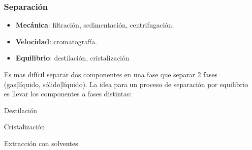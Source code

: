             
            \begin{quote}
                \textit{}
            \end{quote}
            
            
            \begin{quote}
                \textit{}
            \end{quote}
            
            
            \begin{quote}
                \textit{}
            \end{quote}
        
        \subsubsection{Separación}
        
            
            \begin{itemize}
                \item \textbf{Mecánica}: filtración, sedimentación, centrifugación.
                \item \textbf{Velocidad}: cromatografía.
                \item \textbf{Equilibrio}: destilación, cristalización
            \end{itemize}
            
            
            Es mas difícil separar dos componentes en una fase que separar 2 fases (gas|líquido, sólido|líquido). La idea para un proceso de separación por equilibrio es llevar los componentes a fases distintas:
            
            \begin{itemize}
                \begin{minipage}{0.3\linewidth}
                    \item Destilación
                \end{minipage}
                \begin{minipage}{0.3\linewidth}
                    \item Cristalización
                \end{minipage}
                \begin{minipage}{0.3\linewidth}
                    \item Extracción con solventes
                \end{minipage}
            \end{itemize}
            
